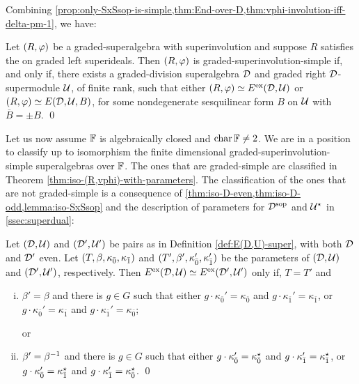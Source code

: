 
Combining \cref{prop:only-SxSsop-is-simple,thm:End-over-D,thm:vphi-involution-iff-delta-pm-1}, we have:

\begin{cor}\label{cor:SxSsop-with-dcc}
    Let $(R, \varphi)$ be a graded-superalgebra with superinvolution and suppose $R$ satisfies the \dcc on graded left superideals. 
    Then $(R, \varphi)$ is graded-superinvolution-simple if, and only if, there exists a graded-division superalgebra $\mathcal{D}$ and graded right $\mathcal{D}$-supermodule $\mathcal U$, of finite rank, such that either
    $(R, \varphi) \simeq E^{\mathrm{ex}} (\mathcal{D}, \mathcal U)$ or $(R, \varphi) \simeq E(\mathcal{D}, \mathcal U, B)$, for some nondegenerate sesquilinear form $B$ on $\mathcal U$ with $\overline{B} = \pm B$. \qed
\end{cor}

Let us now assume $\mathbb{F}$ is algebraically closed and $\operatorname{char} \mathbb{F} \neq 2$. 
We are in a position to classify up to isomorphism the finite dimensional graded-superinvolution-simple  superalgebras over $\mathbb{F}$. 
The ones that are graded-simple are classified in Theorem \ref{thm:iso-(R,vphi)-with-parameters}. 
The classification of the ones that are not graded-simple is a consequence of \cref{thm:iso-D-even,thm:iso-D-odd,lemma:iso-SxSsop} and the description of parameters for $\mathcal{D}^{\mathrm{sop}}$ and $\mathcal U^\star$ in \cref{ssec:superdual}:

\begin{thm}\label{thm:iso-D-even-ExEsop}
	Let $(\mathcal{D}, \mathcal U)$ and $(\mathcal{D}', \mathcal U')$ be pairs as in Definition \ref{def:E(D,U)-super}, with both $\mathcal{D}$ and $\mathcal{D}'$ even. 
	Let $(T, \beta, \kappa_{\bar{0}}, \kappa_{\bar{1}})$ and $(T', \beta', \kappa_{\bar{0}}', \kappa_{\bar{1}}')$ be the parameters of $(\mathcal{D}, \mathcal U)$ and $(\mathcal{D}', \mathcal U')$, respectively. 
	Then $E^{\mathrm{ex}}(\mathcal{D}, \mathcal U) \simeq E^{\mathrm{ex}}(\mathcal{D}', \mathcal U')$ only if, $T=T'$ and
	\begin{enumerate}[(i)]
	    \item $\beta'=\beta$ and there is $g\in G$ such that either $g \cdot \kappa_{\bar 0}'=\kappa_{\bar 0}$ and $g \cdot \kappa_{\bar 1}'=\kappa_{\bar 1}$, or $g \cdot \kappa_{\bar 0}'=\kappa_{\bar 1}$ and $g \cdot \kappa_{\bar 1}'=\kappa_{\bar 0}$;
	    
	    or
	    \item $\beta'=\beta^{-1}$ and there is $g\in G$ such that either $g \cdot \kappa_{\bar 0}'=\kappa_{\bar 0}^\star$ and $g \cdot \kappa_{\bar 1}'=\kappa_{\bar 1}^\star$, or $g \cdot \kappa_{\bar 0}'=\kappa_{\bar 1}^\star$ and $g \cdot \kappa_{\bar 1}'=\kappa_{\bar 0}^\star$. \qed
	\end{enumerate}
\end{thm}


